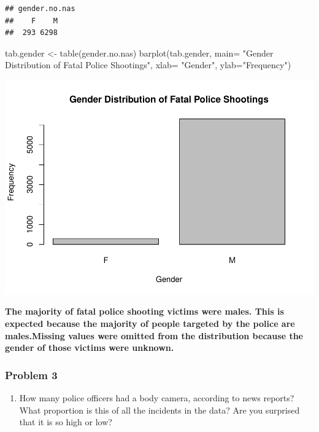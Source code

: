 \documentclass[
]{article}
\newenvironment{Shaded}{\begin{snugshade}}{\end{snugshade}}
\newcommand{\AttributeTok}[1]{\textcolor[rgb]{0.77,0.63,0.00}{#1}}
\newcommand{\FunctionTok}[1]{\textcolor[rgb]{0.00,0.00,0.00}{#1}}
\newcommand{\NormalTok}[1]{#1}
\newcommand{\OtherTok}[1]{\textcolor[rgb]{0.56,0.35,0.01}{#1}}
\newcommand{\StringTok}[1]{\textcolor[rgb]{0.31,0.60,0.02}{#1}}
\providecommand{\tightlist}{%
  \setlength{\itemsep}{0pt}\setlength{\parskip}{0pt}}
\begin{document}
\begin{verbatim}
## gender.no.nas
##    F    M 
##  293 6298
\end{verbatim}

\begin{Shaded}
\begin{Highlighting}[]
\NormalTok{tab.gender }\OtherTok{\textless{}{-}} \FunctionTok{table}\NormalTok{(gender.no.nas)}
\FunctionTok{barplot}\NormalTok{(tab.gender, }\AttributeTok{main=} \StringTok{"Gender Distribution of Fatal Police Shootings"}\NormalTok{, }\AttributeTok{xlab=} \StringTok{"Gender"}\NormalTok{, }\AttributeTok{ylab=}\StringTok{"Frequency"}\NormalTok{)}
\end{Highlighting}
\end{Shaded}

\includegraphics{Assignments_files/figure-latex/unnamed-chunk-23-1.pdf}

\textbf{The majority of fatal police shooting victims were males. This
is expected because the majority of people targeted by the police are
males.Missing values were omitted from the distribution because the
gender of those victims were unknown.}

\hypertarget{problem-3-1}{%
\subsubsection{Problem 3}\label{problem-3-1}}

\begin{enumerate}
\def\labelenumi{\alph{enumi}.}
\tightlist
\item
  How many police officers had a body camera, according to news reports?
  What proportion is this of all the incidents in the data? Are you
  surprised that it is so high or low?
\end{enumerate}
\end{document}
